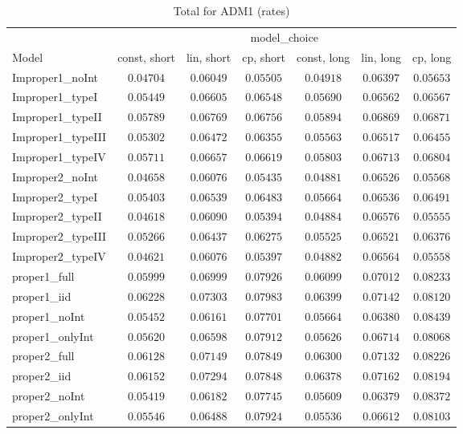 \begin{table}

\caption{\label{tab:model-choice-sc11}Total for ADM1 (rates)}
\centering
\begin{tabular}{lcccccc}
\hline
 & \multicolumn{6}{c}{model_choice} \\ 
Model  & const, short & lin, short & cp, short & const, long & lin, long & \multicolumn{1}{c}{cp, long} \\ 
\hline
Improper1_noInt  & $0.04704$ & $0.06049$ & $0.05505$ & $0.04918$ & $0.06397$ & $0.05653$ \\
Improper1_typeI  & $0.05449$ & $0.06605$ & $0.06548$ & $0.05690$ & $0.06562$ & $0.06567$ \\
Improper1_typeII  & $0.05789$ & $0.06769$ & $0.06756$ & $0.05894$ & $0.06869$ & $0.06871$ \\
Improper1_typeIII  & $0.05302$ & $0.06472$ & $0.06355$ & $0.05563$ & $0.06517$ & $0.06455$ \\
Improper1_typeIV  & $0.05711$ & $0.06657$ & $0.06619$ & $0.05803$ & $0.06713$ & $0.06804$ \\
Improper2_noInt  & $0.04658$ & $0.06076$ & $0.05435$ & $0.04881$ & $0.06526$ & $0.05568$ \\
Improper2_typeI  & $0.05403$ & $0.06539$ & $0.06483$ & $0.05664$ & $0.06536$ & $0.06491$ \\
Improper2_typeII  & $0.04618$ & $0.06090$ & $0.05394$ & $0.04884$ & $0.06576$ & $0.05555$ \\
Improper2_typeIII  & $0.05266$ & $0.06437$ & $0.06275$ & $0.05525$ & $0.06521$ & $0.06376$ \\
Improper2_typeIV  & $0.04621$ & $0.06076$ & $0.05397$ & $0.04882$ & $0.06564$ & $0.05558$ \\
proper1_full  & $0.05999$ & $0.06999$ & $0.07926$ & $0.06099$ & $0.07012$ & $0.08233$ \\
proper1_iid  & $0.06228$ & $0.07303$ & $0.07983$ & $0.06399$ & $0.07142$ & $0.08120$ \\
proper1_noInt  & $0.05452$ & $0.06161$ & $0.07701$ & $0.05664$ & $0.06380$ & $0.08439$ \\
proper1_onlyInt  & $0.05620$ & $0.06598$ & $0.07912$ & $0.05626$ & $0.06714$ & $0.08068$ \\
proper2_full  & $0.06128$ & $0.07149$ & $0.07849$ & $0.06300$ & $0.07132$ & $0.08226$ \\
proper2_iid  & $0.06152$ & $0.07294$ & $0.07848$ & $0.06378$ & $0.07162$ & $0.08194$ \\
proper2_noInt  & $0.05419$ & $0.06182$ & $0.07745$ & $0.05609$ & $0.06379$ & $0.08372$ \\
proper2_onlyInt  & $0.05546$ & $0.06488$ & $0.07924$ & $0.05536$ & $0.06612$ & $0.08103$ \\
\hline 
\end{tabular}


\end{table}